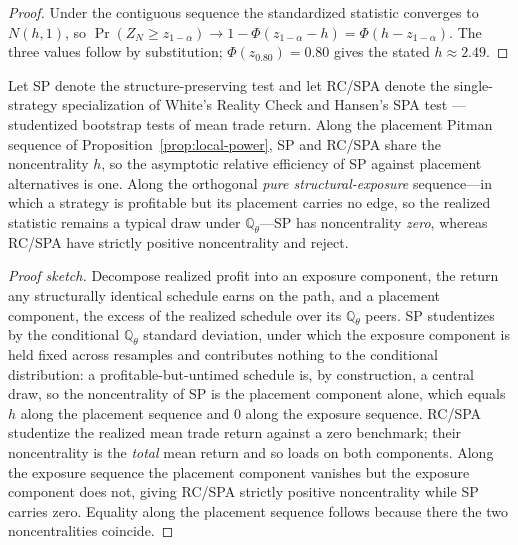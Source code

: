 \begin{proof}
Under the contiguous sequence the standardized statistic converges to $N(h,1)$,
so $\Pr(Z_N\ge z_{1-\alpha})\to1-\Phi(z_{1-\alpha}-h)=\Phi(h-z_{1-\alpha})$. The
three values follow by substitution; $\Phi(z_{0.80})=0.80$ gives the stated
$h\approx2.49$.
\end{proof}

\begin{proposition}
\label{prop:orthogonality}
Let SP denote the structure-preserving test and let RC/SPA denote the
single-strategy specialization of White's Reality Check \cite{white2000} and
Hansen's SPA test \cite{hansen2005}---studentized bootstrap tests of mean trade
return. Along the placement Pitman sequence of Proposition~\ref{prop:local-power},
SP and RC/SPA share the noncentrality $h$, so the asymptotic relative efficiency
of SP against placement alternatives is one. Along the orthogonal \emph{pure
structural-exposure} sequence---in which a strategy is profitable but its
placement carries no edge, so the realized statistic remains a typical draw under
$\mathbb{Q}_\theta$---SP has noncentrality \emph{zero}, whereas RC/SPA have
strictly positive noncentrality and reject.
\end{proposition}

\begin{proof}[Proof sketch]
Decompose realized profit into an exposure component, the return any structurally
identical schedule earns on the path, and a placement component, the excess of the
realized schedule over its $\mathbb{Q}_\theta$ peers. SP studentizes by the
conditional $\mathbb{Q}_\theta$ standard deviation, under which the exposure
component is held fixed across resamples and contributes nothing to the
conditional distribution: a profitable-but-untimed schedule is, by construction,
a central draw, so the noncentrality of SP is the placement component alone,
which equals $h$ along the placement sequence and $0$ along the exposure
sequence. RC/SPA studentize the realized mean trade return against a zero
benchmark; their noncentrality is the \emph{total} mean return and so loads on
both components. Along the exposure sequence the placement component vanishes but
the exposure component does not, giving RC/SPA strictly positive noncentrality
while SP carries zero. Equality along the placement sequence follows because there
the two noncentralities coincide.
\end{proof}

